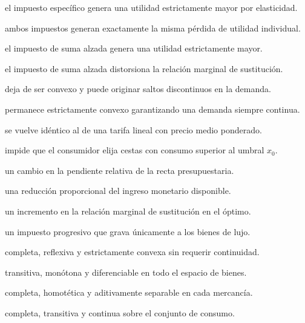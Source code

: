 \begin{opts}
    \item el impuesto específico genera una utilidad estrictamente mayor por elasticidad.
    \item ambos impuestos generan exactamente la misma pérdida de utilidad individual.
    \item el impuesto de suma alzada genera una utilidad estrictamente mayor.
    \item el impuesto de suma alzada distorsiona la relación marginal de sustitución.
\end{opts}

\begin{opts}
    \item deja de ser convexo y puede originar saltos discontinuos en la demanda.
    \item permanece estrictamente convexo garantizando una demanda siempre continua.
    \item se vuelve idéntico al de una tarifa lineal con precio medio ponderado.
    \item impide que el consumidor elija cestas con consumo superior al umbral $x_0$.
\end{opts}

\begin{opts}
    \item un cambio en la pendiente relativa de la recta presupuestaria.
    \item una reducción proporcional del ingreso monetario disponible.
    \item un incremento en la relación marginal de sustitución en el óptimo.
    \item un impuesto progresivo que grava únicamente a los bienes de lujo.
\end{opts}

\begin{opts}
    \item completa, reflexiva y estrictamente convexa sin requerir continuidad.
    \item transitiva, monótona y diferenciable en todo el espacio de bienes.
    \item completa, homotética y aditivamente separable en cada mercancía.
    \item completa, transitiva y continua sobre el conjunto de consumo.
\end{opts}

